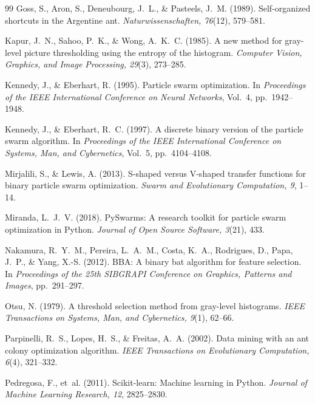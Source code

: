 \documentclass[11pt,a4paper]{article}
\begin{document}
\begin{thebibliography}{99}
Goss, S., Aron, S., Deneubourg, J.~L., \& Pasteels, J.~M. (1989).
Self-organized shortcuts in the Argentine ant.
\emph{Naturwissenschaften, 76}(12), 579--581.

Kapur, J.~N., Sahoo, P.~K., \& Wong, A.~K.~C. (1985).
A new method for gray-level picture thresholding using the entropy of the histogram.
\emph{Computer Vision, Graphics, and Image Processing, 29}(3), 273--285.

Kennedy, J., \& Eberhart, R. (1995).
Particle swarm optimization.
In \emph{Proceedings of the IEEE International Conference on Neural Networks}, Vol.~4, pp.~1942--1948.

Kennedy, J., \& Eberhart, R.~C. (1997).
A discrete binary version of the particle swarm algorithm.
In \emph{Proceedings of the IEEE International Conference on Systems, Man, and Cybernetics}, Vol.~5, pp.~4104--4108.

Mirjalili, S., \& Lewis, A. (2013).
S-shaped versus V-shaped transfer functions for binary particle swarm optimization.
\emph{Swarm and Evolutionary Computation, 9}, 1--14.

Miranda, L.~J.~V. (2018).
PySwarms: A research toolkit for particle swarm optimization in Python.
\emph{Journal of Open Source Software, 3}(21), 433.

Nakamura, R.~Y.~M., Pereira, L.~A.~M., Costa, K.~A., Rodrigues, D., Papa, J.~P., \& Yang, X.-S. (2012).
BBA: A binary bat algorithm for feature selection.
In \emph{Proceedings of the 25th SIBGRAPI Conference on Graphics, Patterns and Images}, pp.~291--297.

Otsu, N. (1979).
A threshold selection method from gray-level histograms.
\emph{IEEE Transactions on Systems, Man, and Cybernetics, 9}(1), 62--66.

Parpinelli, R.~S., Lopes, H.~S., \& Freitas, A.~A. (2002).
Data mining with an ant colony optimization algorithm.
\emph{IEEE Transactions on Evolutionary Computation, 6}(4), 321--332.

Pedregosa, F., et~al. (2011).
Scikit-learn: Machine learning in Python.
\emph{Journal of Machine Learning Research, 12}, 2825--2830.


\end{thebibliography}
\end{document}
